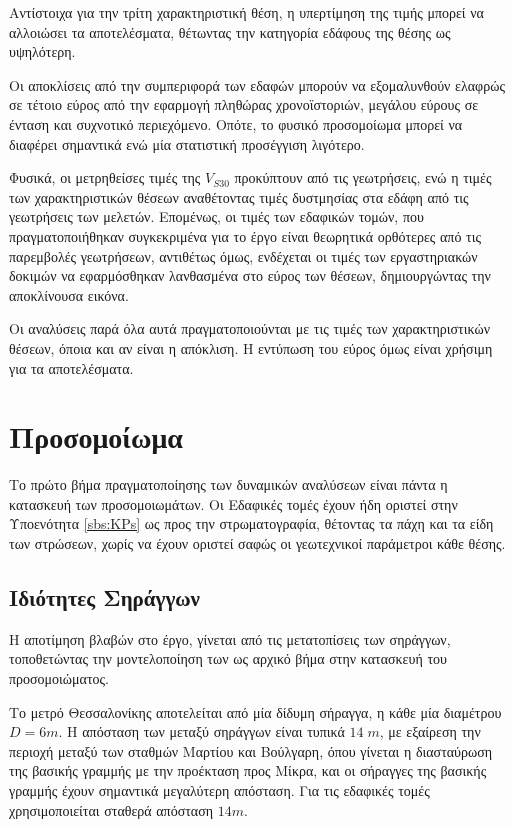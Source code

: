Αντίστοιχα για την τρίτη χαρακτηριστική θέση, η υπερτίμηση της τιμής μπορεί να αλλοιώσει τα αποτελέσματα, θέτωντας την κατηγορία εδάφους της θέσης ως υψηλότερη.

Οι αποκλίσεις από την συμπεριφορά των εδαφών μπορούν να εξομαλυνθούν ελαφρώς σε τέτοιο εύρος από την εφαρμογή πληθώρας χρονοϊστοριών, μεγάλου εύρους σε ένταση και συχνοτικό περιεχόμενο. Οπότε, το φυσικό προσομοίωμα μπορεί να διαφέρει σημαντικά ενώ μία στατιστική προσέγγιση λιγότερο.

Φυσικά, οι μετρηθείσες τιμές της $V_{S30}$ προκύπτουν από τις γεωτρήσεις, ενώ η τιμές των χαρακτηριστικών θέσεων αναθέτοντας τιμές δυστμησίας στα εδάφη από τις γεωτρήσεις των μελετών. Επομένως, οι τιμές των εδαφικών τομών, που πραγματοποιήθηκαν συγκεκριμένα για το έργο είναι θεωρητικά ορθότερες από τις παρεμβολές γεωτρήσεων, αντιθέτως όμως, ενδέχεται οι τιμές των εργαστηριακών δοκιμών να εφαρμόσθηκαν λανθασμένα στο εύρος των θέσεων, δημιουργώντας την αποκλίνουσα εικόνα.

Οι αναλύσεις παρά όλα αυτά πραγματοποιούνται με τις τιμές των χαρακτηριστικών θέσεων, όποια και αν είναι η απόκλιση. Η εντύπωση του εύρος όμως είναι χρήσιμη για τα αποτελέσματα.


\section{Προσομοίωμα}
Το πρώτο βήμα πραγματοποίησης των δυναμικών αναλύσεων είναι πάντα η κατασκευή των προσομοιωμάτων. Οι Εδαφικές τομές έχουν ήδη οριστεί στην Υποενότητα \ref{sbs:KPs} ως προς την στρωματογραφία, θέτοντας τα πάχη και τα είδη των στρώσεων, χωρίς να έχουν οριστεί σαφώς οι γεωτεχνικοί παράμετροι κάθε θέσης.

\subsection{Ιδιότητες Σηράγγων}
Η αποτίμηση βλαβών στο έργο, γίνεται από τις μετατοπίσεις των σηράγγων, τοποθετώντας την μοντελοποίηση των ως αρχικό βήμα στην κατασκευή του προσομοιώματος.

Το μετρό Θεσσαλονίκης αποτελείται από μία δίδυμη σήραγγα, η κάθε μία διαμέτρου $D=6m$. Η απόσταση των μεταξύ σηράγγων είναι τυπικά $14\;m$, με εξαίρεση την περιοχή μεταξύ των σταθμών Μαρτίου και Βούλγαρη, όπου γίνεται η διασταύρωση της βασικής γραμμής με την προέκταση προς Μίκρα, και οι σήραγγες της βασικής γραμμής έχουν σημαντικά μεγαλύτερη απόσταση. Για τις εδαφικές τομές χρησιμοποιείται σταθερά απόσταση $14m$.

